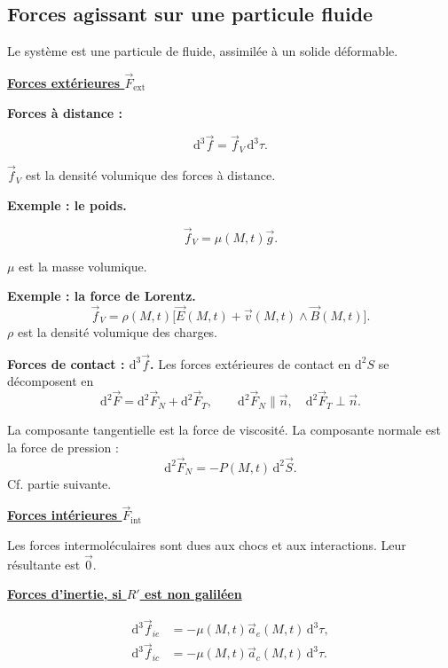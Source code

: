 \documentclass[11pt,a4paper]{article}
\newcommand{\dd}{\mathrm d}
\newcommand{\vv}{\vec v}
\newcommand{\titr}[1]{\par\needspace{4\baselineskip}\textbf{\underline{#1}}\par}
\newcommand{\repere}[1]{\draw[->] (0,0)--(.8,0);\draw[->] (0,0)--(0,.8);\draw[->] (0,0)--(-.45,-.5);\node[below right] at (.15,-.1){$#1$};}
\begin{document}
\subsection{Forces agissant sur une particule fluide}
Le système est une particule de fluide, assimilée à un solide déformable.
\begin{center}\end{center}
\titr{Forces extérieures $\vec F_{\mathrm{ext}}$}
\textbf{Forces à distance :}
\begin{cadre}\[\dd^3\vec f=\vec f_V\,\dd^3\tau.\]\end{cadre}
$\vec f_V$ est la densité volumique des forces à distance.

\begin{exemple}
\textbf{Exemple : le poids.}
\begin{cadre}[etoiles={\mathord{\star}\,\mathord{\star}\,\mathord{\star}\,\mathord{\star}}]\[\vec f_V=\mu(M,t)\vec g.\]\end{cadre}
$\mu$ est la masse volumique.
\end{exemple}
\begin{exemple}
\textbf{Exemple : la force de Lorentz.}
\[\vec f_V=\rho(M,t)\bigl[\vec E(M,t)+\vv(M,t)\wedge\vec B(M,t)\bigr].\]
$\rho$ est la densité volumique des charges.
\end{exemple}
\textbf{Forces de contact : $\dd^3\vec f$.} Les forces extérieures de contact en $\dd^2S$ se décomposent en
\[\dd^2\vec F=\dd^2\vec F_N+\dd^2\vec F_T,\qquad
\dd^2\vec F_N\parallel\vec n,\quad\dd^2\vec F_T\perp\vec n.\]
\begin{minipage}{.29\linewidth}\centering{}\end{minipage}\hfill\begin{minipage}{.67\linewidth}
La composante tangentielle est la force de viscosité. La composante normale est la force de pression :
\[\dd^2\vec F_N=-P(M,t)\,\dd^2\vec S.\]
Cf. partie suivante.
\end{minipage}
\titr{Forces intérieures $\vec F_{\mathrm{int}}$}
Les forces intermoléculaires sont dues aux chocs et aux interactions. Leur résultante est $\vec0$.
\titr{Forces d'inertie, si $R'$ est non galiléen}
\[\begin{aligned}
\dd^3\vec f_{ie}&=-\mu(M,t)\vec a_e(M,t)\,\dd^3\tau,\\
\dd^3\vec f_{ic}&=-\mu(M,t)\vec a_c(M,t)\,\dd^3\tau.
\end{aligned}\]
\end{document}
